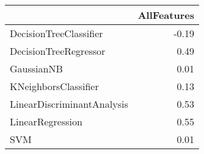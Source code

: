 \begin{tabular}{lr}
\toprule
{} &  AllFeatures \\
\midrule
DecisionTreeClassifier     &        -0.19 \\
DecisionTreeRegressor      &         0.49 \\
GaussianNB                 &         0.01 \\
KNeighborsClassifier       &         0.13 \\
LinearDiscriminantAnalysis &         0.53 \\
LinearRegression           &         0.55 \\
SVM                        &         0.01 \\
\bottomrule
\end{tabular}
